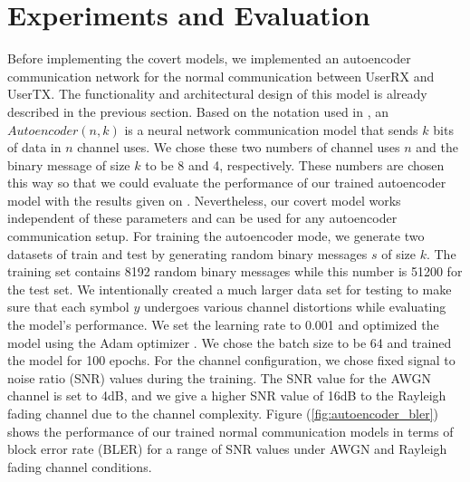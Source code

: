 \section{Experiments and Evaluation}
\label{s:eval}
Before implementing the covert models, we implemented an autoencoder communication network for the normal communication between UserRX and UserTX. The functionality and architectural design of this model is already described in the previous section. Based on the notation used in \cite{o2017introduction}, an \(Autoencoder (n, k)\) is a neural network communication model that sends \(k\) bits of data in \(n\) channel uses. We chose these two numbers of channel uses \(n\) and the binary message of size \(k\) to be 8 and 4, respectively. These numbers are chosen this way so that we could evaluate the performance of our trained autoencoder model with the results given on \cite{o2017introduction}. Nevertheless, our covert model works independent of these parameters and can be used for any autoencoder communication setup. For training the autoencoder mode, we generate two datasets of train and test by generating random binary messages \(s\) of size \(k\). The training set contains 8192 random binary messages while this number is 51200 for the test set. We intentionally created a much larger data set for testing to make sure that each symbol \(y\) undergoes various channel distortions while evaluating the model's performance. We set the learning rate to 0.001 and optimized the model using the Adam optimizer \cite{kingma2014adam}. We chose the batch size to be 64 and trained the model for 100 epochs. For the channel configuration, we chose fixed signal to noise ratio (SNR) values during the training. The SNR value for the AWGN channel is set to 4dB, and we give a higher SNR value of 16dB to the Rayleigh fading channel due to the channel complexity. Figure (\ref{fig:autoencoder_bler}) shows the performance of our trained normal communication models in terms of block error rate (BLER) for a range of SNR values under AWGN and Rayleigh fading channel conditions.\\
